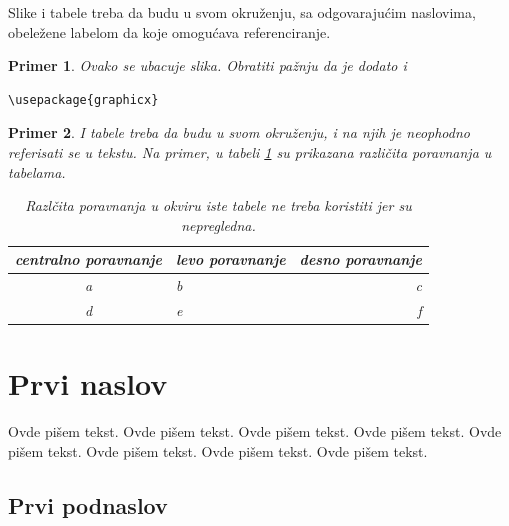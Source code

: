 \documentclass[a4paper]{article}
\newtheorem{primer}{Primer}[section]
\begin{document}
Slike i tabele treba da budu u svom okruženju, sa odgovarajućim naslo\-vima, obeležene labelom da koje omogućava referenciranje. 

\begin{primer} Ovako se ubacuje slika. Obratiti pažnju da je dodato i 
\begin{verbatim}
\usepackage{graphicx}
\end{verbatim}


\end{primer}

\begin{primer} I tabele treba da budu u svom okruženju, i na njih je neopho\-dno referisati se u tekstu. Na primer, u tabeli \ref{tab:tabela1} su prikazana različita pora\-vnanja u tabelama.

\begin{table}[h!]
\begin{center}
\caption{Razlčita poravnanja u okviru iste tabele ne treba koristiti jer su nepregledna.}
\begin{tabular}{|c|l|r|} \hline
centralno poravnanje& levo poravnanje& desno poravnanje\\ \hline
a &b&c\\ \hline
d &e&f\\ \hline
\end{tabular}
\label{tab:tabela1}
\end{center}
\end{table}

\end{primer}





\section{Prvi naslov}
\label{sec:naslov1}


Ovde pišem tekst. 
Ovde pišem tekst. 
Ovde pišem tekst. 
Ovde pišem tekst. 
Ovde pišem tekst. 
Ovde pišem tekst. 
Ovde pišem tekst. 
Ovde pišem tekst. 


\subsection{Prvi podnaslov}
\label{subsec:podnaslov1}
\end{document}
